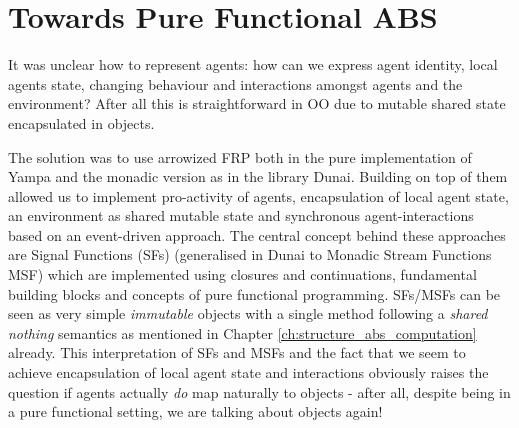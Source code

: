 \section{Towards Pure Functional ABS}
It was unclear how to represent agents: how can we express agent identity, local agents state, changing behaviour and interactions amongst agents and the environment? After all this is straightforward in OO due to mutable shared state encapsulated in objects.

The solution was to use arrowized FRP both in the pure implementation of Yampa and the monadic version as in the library Dunai. Building on top of them allowed us to implement pro-activity of agents, encapsulation of local agent state, an environment as shared mutable state and synchronous agent-interactions based on an event-driven approach. The central concept behind these approaches are Signal Functions (SFs) (generalised in Dunai to Monadic Stream Functions MSF) which are implemented using closures and continuations, fundamental building blocks and concepts of pure functional programming. SFs/MSFs can be seen as very simple \textit{immutable} objects with a single method following a \textit{shared nothing} semantics as mentioned in Chapter \ref{ch:structure_abs_computation} already. This interpretation of SFs and MSFs and the fact that we seem to achieve encapsulation of local agent state and interactions obviously raises the question if agents actually \textit{do} map naturally to objects - after all, despite being in a pure functional setting, we are talking about objects again!








